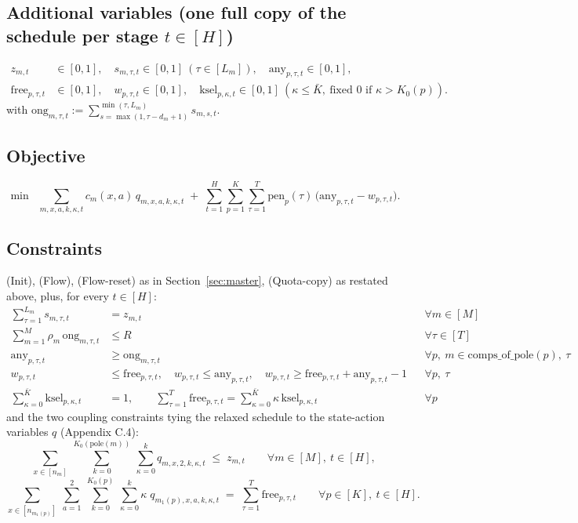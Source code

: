 \documentclass[11pt]{article}
\newcommand{\any}{\mathrm{any}}
\newcommand{\free}{\mathrm{free}}
\newcommand{\ksel}{\mathrm{ksel}}
\newcommand{\ong}{\mathrm{ong}}
\newcommand{\pole}{\mathrm{pole}}
\begin{document}
\subsection*{Additional variables (one full copy of the schedule per stage $t \in [H]$)}
\begin{align*}
  z_{m,t} &\in [0,1], \quad
  s_{m,\tau,t} \in [0,1]\ (\tau \in [L_m]), \quad
  \any_{p,\tau,t} \in [0,1], \\
  \free_{p,\tau,t} &\in [0,1], \quad
  w_{p,\tau,t} \in [0,1], \quad
  \ksel_{p,\kappa,t} \in [0,1]\ (\kappa \le \bar K,\ \text{fixed }0\text{ if } \kappa>K_0(p)).
\end{align*}
with $\ong_{m,\tau,t} := \sum_{s=\max(1,\tau-d_m+1)}^{\min(\tau,L_m)} s_{m,s,t}$.

\subsection*{Objective}
\[
  \min\;\; \sum_{m,x,a,k,\kappa,t} c_m(x,a)\, q_{m,x,a,k,\kappa,t}
  \;+\; \sum_{t=1}^{H}\sum_{p=1}^{K}\sum_{\tau=1}^{T} \mathrm{pen}_p(\tau)\,
        \bigl(\any_{p,\tau,t} - w_{p,\tau,t}\bigr).
\]

\subsection*{Constraints}
(Init), (Flow), (Flow-reset) as in Section~\ref{sec:master}, (Quota-copy) as restated
above, plus, for every $t \in [H]$:
\begin{align}
  \sum_{\tau=1}^{L_m} s_{m,\tau,t} &= z_{m,t}
    &&\forall m \in [M] \tag{10$'$}\\
  \sum_{m=1}^{M} \rho_m\, \ong_{m,\tau,t} &\le R
    &&\forall \tau \in [T] \tag{11$'$}\\
  \any_{p,\tau,t} &\ge \ong_{m,\tau,t}
    &&\forall p,\ m \in \mathrm{comps\_of\_pole}(p),\ \tau \\
  w_{p,\tau,t} &\le \free_{p,\tau,t}, \quad
  w_{p,\tau,t} \le \any_{p,\tau,t}, \quad
  w_{p,\tau,t} \ge \free_{p,\tau,t} + \any_{p,\tau,t} - 1
    &&\forall p,\ \tau \\
  \sum_{\kappa=0}^{\bar K} \ksel_{p,\kappa,t} &= 1, \qquad
  \sum_{\tau=1}^{T} \free_{p,\tau,t} = \sum_{\kappa=0}^{\bar K} \kappa\, \ksel_{p,\kappa,t}
    &&\forall p \tag{12$'$}
\end{align}
and the two coupling constraints tying the relaxed schedule to the state-action variables
$q$ (Appendix C.4):
\[
  \sum_{x \in [n_m]}\ \sum_{k=0}^{K_0(\pole(m))}\ \sum_{\kappa=0}^{k} q_{m,x,2,k,\kappa,t}
  \;\le\; z_{m,t}
  \qquad \forall m \in [M],\ t \in [H], \tag{Coupling-$z$}
\]
\[
  \sum_{x \in [n_{m_1(p)}]}\ \sum_{a=1}^{2}\ \sum_{k=0}^{K_0(p)}\ \sum_{\kappa=0}^{k}
    \kappa\; q_{m_1(p),x,a,k,\kappa,t}
  \;=\; \sum_{\tau=1}^{T} \free_{p,\tau,t}
  \qquad \forall p \in [K],\ t \in [H]. \tag{Coupling-$\kappa$}
\]
\end{document}
